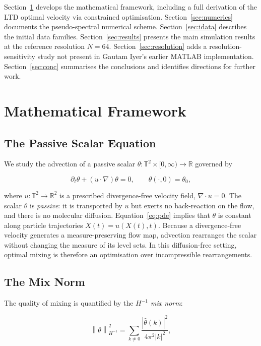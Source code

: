 \documentclass[12pt,a4paper]{article}
\newcommand{\norm}[1]{\left\lVert#1\right\rVert}
\newcommand{\Real}{\mathbb{R}}
\newcommand{\Torus}{\mathbb{T}^2}
\theoremstyle{definition}
\theoremstyle{plain}
\begin{document}
Section~\ref{sec:math} develops the mathematical framework, including a
full derivation of the LTD optimal velocity via constrained optimisation.
Section~\ref{sec:numerics} documents the pseudo-spectral numerical scheme.
Section~\ref{sec:idata} describes the initial data families.
Section~\ref{sec:results} presents the main simulation results at the
reference resolution $N=64$.
Section~\ref{sec:resolution} adds a resolution-sensitivity study not present
in Gautam Iyer's earlier MATLAB implementation.
Section~\ref{sec:conc} summarises the conclusions and identifies directions
for further work.

\section{Mathematical Framework}
\label{sec:math}

\subsection{The Passive Scalar Equation}

We study the advection of a passive scalar $\theta : \Torus\times[0,\infty)
\to \Real$ governed by

\begin{equation}
  \label{eq:pde}
  \partial_t\theta + (u\cdot\nabla)\theta = 0,
  \qquad \theta(\cdot,0) = \theta_0,
\end{equation}

where $u:\Torus\to\Real^2$ is a prescribed divergence-free velocity field,
$\nabla\cdot u = 0$. The scalar $\theta$ is \emph{passive}: it is transported
by $u$ but exerts no back-reaction on the flow, and there is no molecular
diffusion. Equation~\eqref{eq:pde} implies that $\theta$ is constant along
particle trajectories $\dot X(t)=u(X(t),t)$. Because a divergence-free
velocity generates a measure-preserving flow map, advection rearranges the
scalar without changing the measure of its level sets. In this
diffusion-free setting, optimal mixing is therefore an optimisation over
incompressible rearrangements.

\subsection{The Mix Norm}
\label{sec:mixnorm-def}

The quality of mixing is quantified by the \emph{$H^{-1}$ mix norm}:

\begin{equation}
  \label{eq:mixnorm}
  \norm{\theta}_{H^{-1}}^2
  = \sum_{k\neq 0} \frac{|\hat\theta(k)|^2}{4\pi^2|k|^2},
\end{equation}
\end{document}
